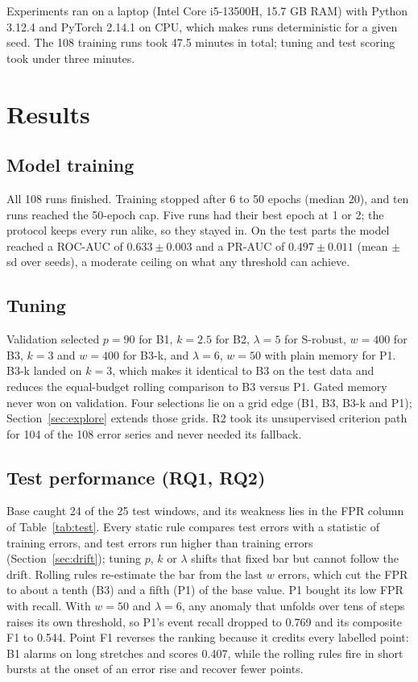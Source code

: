 \documentclass[conference]{IEEEtran}
\begin{document}
Experiments ran on a laptop (Intel Core i5-13500H, 15.7 GB RAM) with Python 3.12.4 and PyTorch 2.14.1 on CPU, which makes runs deterministic for a given seed. The 108 training runs took 47.5 minutes in total; tuning and test scoring took under three minutes.

\section{Results}

\subsection{Model training}
All 108 runs finished. Training stopped after 6 to 50 epochs (median 20), and ten runs reached the 50-epoch cap. Five runs had their best epoch at 1 or 2; the protocol keeps every run alike, so they stayed in. On the test parts the model reached a ROC-AUC of $0.633 \pm 0.003$ and a PR-AUC of $0.497 \pm 0.011$ (mean $\pm$ sd over seeds), a moderate ceiling on what any threshold can achieve.

\subsection{Tuning}
Validation selected $p = 90$ for B1, $k = 2.5$ for B2, $\lambda = 5$ for S-robust, $w = 400$ for B3, $k = 3$ and $w = 400$ for B3-k, and $\lambda = 6$, $w = 50$ with plain memory for P1. B3-k landed on $k = 3$, which makes it identical to B3 on the test data and reduces the equal-budget rolling comparison to B3 versus P1. Gated memory never won on validation. Four selections lie on a grid edge (B1, B3, B3-k and P1); Section~\ref{sec:explore} extends those grids. R2 took its unsupervised criterion path for 104 of the 108 error series and never needed its fallback.

\subsection{Test performance (RQ1, RQ2)}
Base caught 24 of the 25 test windows, and its weakness lies in the FPR column of Table~\ref{tab:test}. Every static rule compares test errors with a statistic of training errors, and test errors run higher than training errors (Section~\ref{sec:drift}); tuning $p$, $k$ or $\lambda$ shifts that fixed bar but cannot follow the drift. Rolling rules re-estimate the bar from the last $w$ errors, which cut the FPR to about a tenth (B3) and a fifth (P1) of the base value. P1 bought its low FPR with recall. With $w = 50$ and $\lambda = 6$, any anomaly that unfolds over tens of steps raises its own threshold, so P1's event recall dropped to 0.769 and its composite F1 to 0.544. Point F1 reverses the ranking because it credits every labelled point: B1 alarms on long stretches and scores 0.407, while the rolling rules fire in short bursts at the onset of an error rise and recover fewer points.
\end{document}
